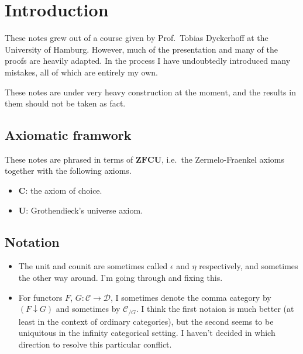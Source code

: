 \documentclass[main.tex]{subfiles}
\begin{document}
\chapter{Introduction}
\label{ch:introduction}

These notes grew out of a course given by Prof.\ Tobias Dyckerhoff at the University of Hamburg. However, much of the presentation and many of the proofs are heavily adapted. In the process I have undoubtedly introduced many mistakes, all of which are entirely my own.

These notes are under very heavy construction at the moment, and the results in them should not be taken as fact.

\section{Axiomatic framwork}
\label{sec:axiomatic_framwork}

These notes are phrased in terms of $\mathbf{ZFCU}$, i.e.\ the Zermelo-Fraenkel axioms together with the following axioms.
\begin{itemize}
  \item $\mathbf{C}$: the axiom of choice.

  \item $\mathbf{U}$: Grothendieck's universe axiom.
\end{itemize}

\section{Notation}
\label{sec:notation}

\begin{itemize}
  \item The unit and counit are sometimes called $\epsilon$ and $\eta$ respectively, and sometimes the other way around. I'm going through and fixing this.

  \item For functors $F$, $G\colon \mathcal{C} \to \mathcal{D}$, I sometimes denote the comma category by $(F \downarrow G)$ and sometimes by $\mathcal{C}_{/G}$. I think the first notaion is much better (at least in the context of ordinary categories), but the second seems to be uniquitous in the infinity categorical setting. I haven't decided in which direction to resolve this particular conflict.
\end{itemize}
\end{document}
